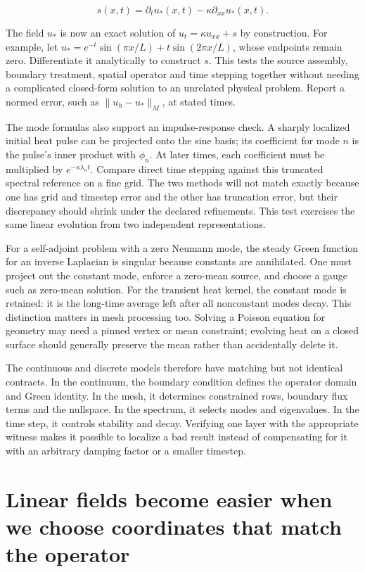 \[
s(x,t)=\partial_tu_*(x,t)-\kappa\partial_{xx}u_*(x,t).
\]

The field \(u_*\) is now an exact solution of \(u_t=\kappa u_{xx}+s\) by construction. For example, let \(u_*=e^{-t}\sin(\pi x/L)+t\sin(2\pi x/L)\), whose endpoints remain zero. Differentiate it analytically to construct \(s\). This tests the source assembly, boundary treatment, spatial operator and time stepping together without needing a complicated closed-form solution to an unrelated physical problem. Report a normed error, such as \(\|u_h-u_*\|_M\), at stated times.

The mode formulas also support an impulse-response check. A sharply localized initial heat pulse can be projected onto the sine basis; its coefficient for mode \(n\) is the pulse's inner product with \(\phi_n\). At later times, each coefficient must be multiplied by \(e^{-\kappa\lambda_nt}\). Compare direct time stepping against this truncated spectral reference on a fine grid. The two methods will not match exactly because one has grid and timestep error and the other has truncation error, but their discrepancy should shrink under the declared refinements. This test exercises the same linear evolution from two independent representations.

For a self-adjoint problem with a zero Neumann mode, the steady Green function for an inverse Laplacian is singular because constants are annihilated. One must project out the constant mode, enforce a zero-mean source, and choose a gauge such as zero-mean solution. For the transient heat kernel, the constant mode is retained: it is the long-time average left after all nonconstant modes decay. This distinction matters in mesh processing too. Solving a Poisson equation for geometry may need a pinned vertex or mean constraint; evolving heat on a closed surface should generally preserve the mean rather than accidentally delete it.

The continuous and discrete models therefore have matching but not identical contracts. In the continuum, the boundary condition defines the operator domain and Green identity. In the mesh, it determines constrained rows, boundary flux terms and the nullspace. In the spectrum, it selects modes and eigenvalues. In the time step, it controls stability and decay. Verifying one layer with the appropriate witness makes it possible to localize a bad result instead of compensating for it with an arbitrary damping factor or a smaller timestep.

\section{Linear fields become easier when we choose coordinates that match the operator}\label{02-foundations-ii-ch025-linear-fields-become-easier-when-we-choose-coordinates-that-match-the-operator}

